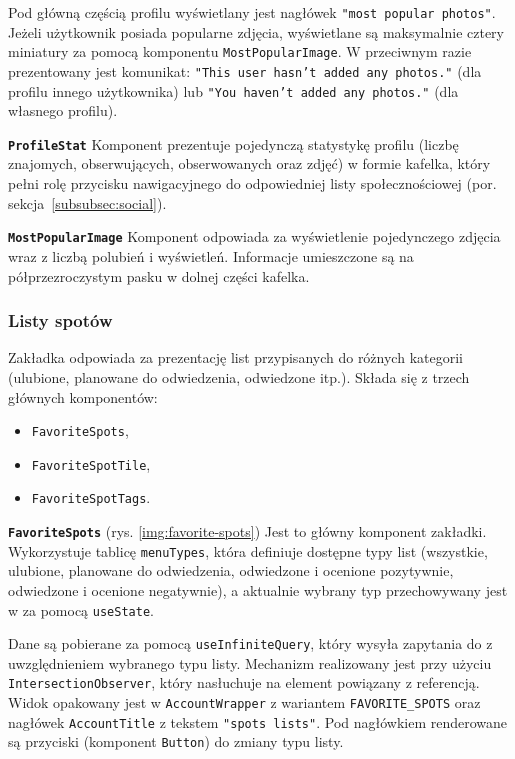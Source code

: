 Pod główną częścią profilu wyświetlany jest nagłówek \texttt{"most popular photos"}.
Jeżeli użytkownik posiada popularne zdjęcia, wyświetlane są maksymalnie cztery miniatury za pomocą komponentu \texttt{MostPopularImage}.
W przeciwnym razie prezentowany jest komunikat:
\texttt{"This user hasn't added any photos."} (dla profilu innego użytkownika) lub
\texttt{"You haven't added any photos."} (dla własnego profilu).

\textbf{\texttt{ProfileStat}}
Komponent prezentuje pojedynczą statystykę profilu (liczbę znajomych, obserwujących, obserwowanych oraz zdjęć) w formie kafelka,
który pełni rolę przycisku nawigacyjnego do odpowiedniej listy społecznościowej (por. sekcja~\ref{subsubsec:social}).

\textbf{\texttt{MostPopularImage}}
Komponent odpowiada za wyświetlenie pojedynczego zdjęcia wraz z liczbą polubień i wyświetleń.
Informacje umieszczone są na półprzezroczystym pasku w dolnej części kafelka.

\subsubsection{Listy spotów}
\label{subsubsec:spots}

Zakładka odpowiada za prezentację list  przypisanych do różnych kategorii
(ulubione, planowane do odwiedzenia, odwiedzone itp.).
Składa się z trzech głównych komponentów:

\begin{itemize}
    \item \texttt{FavoriteSpots},
    \item \texttt{FavoriteSpotTile},
    \item \texttt{FavoriteSpotTags}.
\end{itemize}

\textbf{\texttt{FavoriteSpots}}  (rys. \ref{img:favorite-spots})
Jest to główny komponent zakładki.\newline
Wykorzystuje tablicę \texttt{menuTypes}, która definiuje dostępne typy list
(wszystkie, ulubione, planowane do odwiedzenia, odwiedzone i ocenione pozytywnie, odwiedzone i ocenione negatywnie),
a aktualnie wybrany typ przechowywany jest w  za pomocą  \texttt{useState}.

Dane  są pobierane za pomocą  \texttt{useInfiniteQuery}, który wysyła zapytania do
 z uwzględnieniem wybranego typu listy.
Mechanizm  realizowany jest przy użyciu \texttt{IntersectionObserver},
który nasłuchuje na element powiązany z referencją.
Widok opakowany jest w \texttt{AccountWrapper} z wariantem \texttt{FAVORITE\_SPOTS} oraz nagłówek
\texttt{AccountTitle} z tekstem \texttt{"spots lists"}.
Pod nagłówkiem renderowane są przyciski (komponent \texttt{Button}) do zmiany typu listy.

